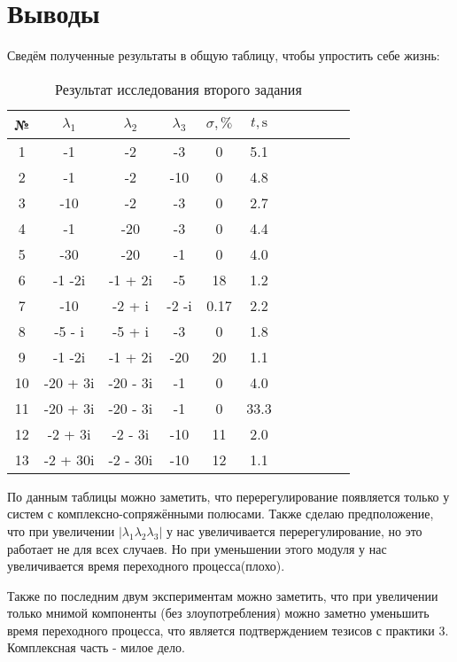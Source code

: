 \newpage
\section{Выводы}
Сведём полученные результаты в общую таблицу, чтобы упростить себе жизнь:



\begin{table}[h!]
    \centering
    \begin{tabular}{|c|c|c|c|c|c|c|c|c|c|c|}
        \hline
        № & $\lambda_1$ & $\lambda_2$ & $\lambda_3$ & $\sigma,\%$ & $t, \text{s}$ \\
        \hline
        1 & -1 & -2 & -3 & 0 & 5.1 \\
        2 & -1 & -2 & -10 & 0 & 4.8 \\
        3 & -10 & -2 & -3 & 0 & 2.7 \\
        4 & -1 & -20 & -3 & 0 & 4.4\\
        5 & -30 & -20 & -1 & 0 & 4.0\\
        6 & -1 -2i & -1 + 2i & -5 & 18 & 1.2 \\
        7 & -10 & -2 + i & -2 -i & 0.17 & 2.2 \\
        8 & -5 - i & -5 + i & -3 & 0 & 1.8 \\
        9 & -1 -2i & -1 + 2i & -20 & 20 & 1.1 \\
        10 & -20 + 3i & -20 - 3i & -1 & 0 & 4.0\\
        11 & -20 + 3i & -20 - 3i & -1 & 0 & 33.3\\
        12 & -2 + 3i & -2 - 3i & -10  & 11 & 2.0\\
        13 & -2 + 30i & -2 - 30i & -10 & 12 & 1.1\\
        \hline
    \end{tabular}
    \caption{Результат исследования второго задания}
\end{table}

По данным таблицы можно заметить, что перерегулирование появляется только у систем с комплексно-сопряжёнными полюсами. 
Также сделаю предположение, что  при увеличении $|\lambda_1\lambda_2\lambda_3|$ у нас увеличивается перерегулирование, но это работает не для всех случаев. 
Но при уменьшении этого модуля у нас увеличивается время переходного процесса(плохо).

Также по последним двум экспериментам можно заметить, что при увеличении только мнимой компоненты (без злоупотребления) можно заметно уменьшить время переходного процесса, что является подтверждением тезисов с практики 3. Комплексная часть - милое дело.


\endinput
